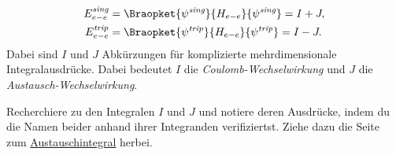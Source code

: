 \documentclass{subfiles}
\begin{document}
        \begin{align*}
            E_{e-e}^\textit{sing} &= \Braopket{\psi^\textit{sing}}{H_{e-e}}{\psi^\textit{sing}} = I + J, \\
            E_{e-e}^\textit{trip} &= \Braopket{\psi^\textit{trip}}{H_{e-e}}{\psi^\textit{trip}} = I - J.
        \end{align*} 
        Dabei sind $I$ und $J$ Abkürzungen für komplizierte mehrdimensionale Integralausdrücke. Dabei bedeutet $I$ die \emph{Coulomb-Wechselwirkung} und $J$ die \emph{Austausch-Wechselwirkung}. 
        \begin{Aufgabe}
            \nr{} Recherchiere zu den Integralen $I$ und $J$ und notiere deren Ausdrücke, indem du die Namen beider anhand ihrer Integranden verifiziertst. Ziehe dazu die Seite zum \href{https://de.wikipedia.org/wiki/Austauschwechselwirkung}{Austauschintegral} herbei.
        \end{Aufgabe}
\end{document}
